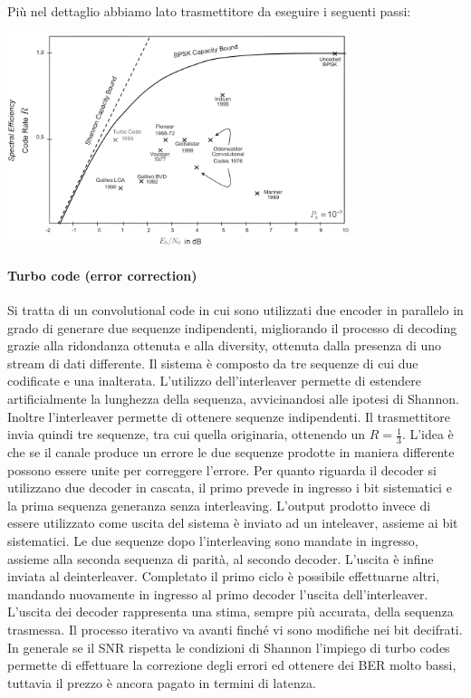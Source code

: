 Più nel dettaglio abbiamo lato trasmettitore da eseguire i seguenti passi:

\begin{center}
    \includegraphics[width=0.75\textwidth]{imgs/codes_and_shannon_bound.png}
\end{center}
\paragraph*{Turbo code (error correction)}

Si tratta di un convolutional code in cui sono utilizzati due encoder in parallelo in grado di generare due sequenze indipendenti, migliorando il processo di decoding grazie alla ridondanza ottenuta e alla diversity, ottenuta dalla presenza di uno stream di dati differente.
Il sistema è composto da tre sequenze di cui due codificate e una inalterata. L'utilizzo dell'interleaver permette di estendere artificialmente la lunghezza della sequenza, avvicinandosi alle ipotesi di Shannon. Inoltre l'interleaver permette di ottenere sequenze indipendenti. 
Il trasmettitore invia quindi tre sequenze, tra cui quella originaria, ottenendo un $R=\frac{1}{3}$. L'idea è che se il canale produce un errore le due sequenze prodotte in maniera differente possono essere unite  per correggere l'errore.
Per quanto riguarda il decoder si utilizzano due decoder in cascata, il primo prevede in ingresso i bit sistematici e la prima sequenza generanza senza interleaving. L'output prodotto invece di essere utilizzato come uscita del sistema è inviato ad un inteleaver, assieme ai bit sistematici. 
Le due sequenze dopo l'interleaving sono mandate in ingresso, assieme alla seconda sequenza di parità, al secondo decoder. L'uscita è infine inviata al deinterleaver. 
Completato il primo ciclo è possibile effettuarne altri, mandando nuovamente in ingresso al primo decoder l'uscita dell'interleaver. 
L'uscita dei decoder rappresenta una stima, sempre più accurata, della sequenza trasmessa. Il processo iterativo va avanti finché vi sono modifiche nei bit decifrati.
In generale se il SNR rispetta le condizioni di Shannon l'impiego di turbo codes permette di effettuare la correzione degli errori ed ottenere dei BER molto bassi, tuttavia il prezzo è ancora pagato in termini di latenza.






